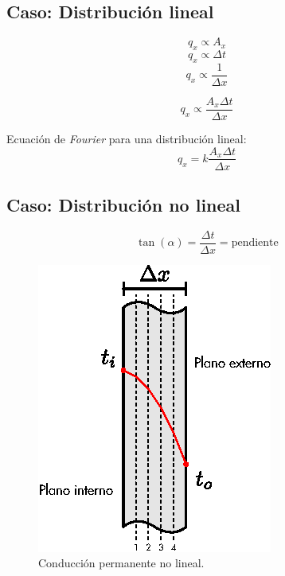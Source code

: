 \subsection{Caso: Distribución lineal}
\begin{equation*}
    q_x\propto A_x
\end{equation*}
\begin{equation*}
    q_x\propto\Delta t
\end{equation*}
\begin{equation*}
    q_x\propto \frac{1}{\Delta x}
\end{equation*}

\begin{equation*}
    q_x\propto \frac{A_x \Delta t}{\Delta x}
\end{equation*}

Ecuación de \emph{Fourier} para una distribución lineal:
\begin{equation}
    q_x=k\frac{A_x \Delta t}{\Delta x}
    \label{fourier}
\end{equation}

\subsection{Caso: Distribución no lineal}
\begin{equation*}
    \tan(\alpha)=\frac{\Delta t}{\Delta x}=\text{pendiente}
\end{equation*}

\begin{figure}[!h]
\centering
\includegraphics[scale=1.20]{figura02_04.eps}
\caption{Conducción permanente no lineal.}
\end{figure}

